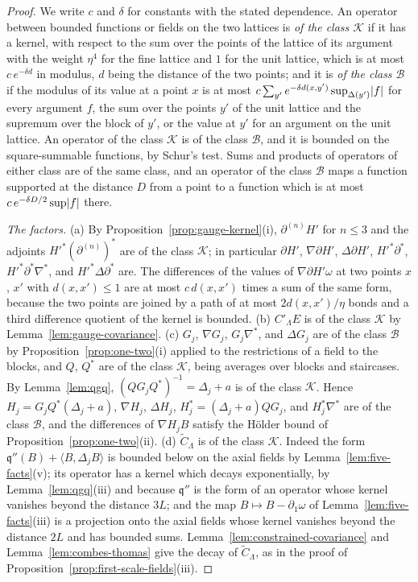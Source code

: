 \documentclass[11pt]{preprint}
\DeclarePairedDelimiter{\abs}{\lvert}{\rvert}
\numberwithin{equation}{section}
\theoremstyle{definition}
\theoremstyle{remark}
\theoremstyle{plain}
\begin{document}
\begin{proof}
We write $c$ and $\delta$ for constants with the stated dependence. An operator between bounded functions or fields on the two lattices is \emph{of the class $\mathcal K$} if it has a kernel, with respect to the sum over the points of the lattice of its argument with the weight $\eta^4$ for the fine lattice and $1$ for the unit lattice, which is at most $c\,e^{-\delta d}$ in modulus, $d$ being the distance of the two points; and it is \emph{of the class $\mathcal B$} if the modulus of its value at a point $x$ is at most $c\sum_{y'}e^{-\delta d(x, y')}\sup_{\Delta(y')}\abs f$ for every argument $f$, the sum over the points $y'$ of the unit lattice and the supremum over the block of $y'$, or the value at $y'$ for an argument on the unit lattice. An operator of the class $\mathcal K$ is of the class $\mathcal B$, and it is bounded on the square-summable functions, by Schur's test. Sums and products of operators of either class are of the same class, and an operator of the class $\mathcal B$ maps a function supported at the distance $D$ from a point to a function which is at most $c\,e^{-\delta D/2}\sup\abs f$ there.

\emph{The factors.} (a) By Proposition~\ref{prop:gauge-kernel}(i), $\partial^{(n)}H'$ for $n \leq 3$ and the adjoints $H'^*(\partial^{(n)})^*$ are of the class $\mathcal K$; in particular $\partial H'$, $\nabla\partial H'$, $\Delta\partial H'$, $H'^*\partial^*$, $H'^*\partial^*\nabla^*$, and $H'^*\Delta\partial^*$ are. The differences of the values of $\nabla\partial H'\omega$ at two points $x$, $x'$ with $d(x, x') \leq 1$ are at most $c\,d(x, x')$ times a sum of the same form, because the two points are joined by a path of at most $2d(x, x')/\eta$ bonds and a third difference quotient of the kernel is bounded. (b) $C'_\Lambda E$ is of the class $\mathcal K$ by Lemma~\ref{lem:gauge-covariance}. (c) $G_j$, $\nabla G_j$, $G_j\nabla^*$, and $\Delta G_j$ are of the class $\mathcal B$ by Proposition~\ref{prop:one-two}(i) applied to the restrictions of a field to the blocks, and $Q$, $Q^*$ are of the class $\mathcal K$, being averages over blocks and staircases. By Lemma~\ref{lem:qgq}, $(QG_jQ^*)^{-1} = \Delta_j + a$ is of the class $\mathcal K$. Hence $H_j = G_jQ^*(\Delta_j + a)$, $\nabla H_j$, $\Delta H_j$, $H_j^* = (\Delta_j + a)QG_j$, and $H_j^*\nabla^*$ are of the class $\mathcal B$, and the differences of $\nabla H_jB$ satisfy the H\"older bound of Proposition~\ref{prop:one-two}(ii). (d) $\tilde C_\Lambda$ is of the class $\mathcal K$. Indeed the form $\mathfrak q''(B) + \langle B, \Delta_jB\rangle$ is bounded below on the axial fields by Lemma~\ref{lem:five-facts}(v); its operator has a kernel which decays exponentially, by Lemma~\ref{lem:qgq}(iii) and because $\mathfrak q''$ is the form of an operator whose kernel vanishes beyond the distance $3L$; and the map $B \mapsto B - \partial_1\omega$ of Lemma~\ref{lem:five-facts}(iii) is a projection onto the axial fields whose kernel vanishes beyond the distance $2L$ and has bounded sums. Lemma~\ref{lem:constrained-covariance} and Lemma~\ref{lem:combes-thomas} give the decay of $\tilde C_\Lambda$, as in the proof of Proposition~\ref{prop:first-scale-fields}(iii).


\end{proof}
\end{document}
